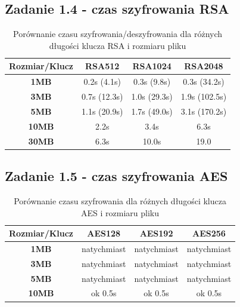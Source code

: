 \documentclass{article}
\begin{document}
\subsection{Zadanie 1.4 - czas szyfrowania RSA}

\begin{table}[H]
    \centering
    \caption{Porównanie czasu szyfrowania/deszyfrowania dla różnych długości klucza RSA i rozmiaru pliku}
    \begin{tabular}{|c|c|c|c|}
        \hline
        \textbf{Rozmiar/Klucz} & \textbf{RSA512} & \textbf{RSA1024} & \textbf{RSA2048} \\ \hline
        \textbf{1MB}           & 0.2s (4.1s)     & 0.3s (9.8s)      & 0.3s (34.2s)     \\ \hline
        \textbf{3MB}           & 0.7s (12.3s)    & 1.0s (29.3s)     & 1.9s (102.5s)    \\ \hline
        \textbf{5MB}           & 1.1s (20.9s)    & 1.7s (49.0s)     & 3.1s (170.2s)    \\ \hline
        \textbf{10MB}          & 2.2s            & 3.4s             & 6.3s             \\ \hline
        \textbf{30MB}          & 6.3s            & 10.0s            & 19.0             \\ \hline
    \end{tabular}
\end{table}

\subsection{Zadanie 1.5 - czas szyfrowania AES}

\begin{table}[H]
    \centering
    \caption{Porównanie czasu szyfrowania dla różnych długości klucza AES i rozmiaru pliku}
    \begin{tabular}{|c|c|c|c|}
        \hline
        \textbf{Rozmiar/Klucz} & \textbf{AES128} & \textbf{AES192} & \textbf{AES256} \\ \hline
        \textbf{1MB}           & natychmiast     & natychmiast     & natychmiast     \\ \hline
        \textbf{3MB}           & natychmiast     & natychmiast     & natychmiast     \\ \hline
        \textbf{5MB}           & natychmiast     & natychmiast     & natychmiast     \\ \hline
        \textbf{10MB}          & ok 0.5s         & ok 0.5s         & ok 0.5s         \\ \hline
    \end{tabular}
\end{table}
\end{document}
